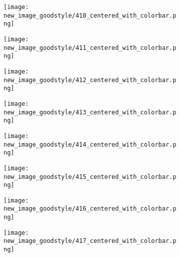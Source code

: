 \documentclass[a4paper,12pt]{article}
\begin{document}
\begin{figure}[H]
  \begin{subfigure}{0.11\textwidth}
    \texttt{[image: new\_image\_goodstyle/410\_centered\_with\_colorbar.png]}
  \end{subfigure}
  \hfill
  \begin{subfigure}{0.11\textwidth}
    \texttt{[image: new\_image\_goodstyle/411\_centered\_with\_colorbar.png]}
  \end{subfigure}
  \hfill
  \begin{subfigure}{0.11\textwidth}
    \texttt{[image: new\_image\_goodstyle/412\_centered\_with\_colorbar.png]}
  \end{subfigure}
  \hfill
  \begin{subfigure}{0.11\textwidth}
    \texttt{[image: new\_image\_goodstyle/413\_centered\_with\_colorbar.png]}
  \end{subfigure}
  \hfill
  \begin{subfigure}{0.11\textwidth}
    \texttt{[image: new\_image\_goodstyle/414\_centered\_with\_colorbar.png]}
  \end{subfigure}
  \hfill
  \begin{subfigure}{0.11\textwidth}
    \texttt{[image: new\_image\_goodstyle/415\_centered\_with\_colorbar.png]}
  \end{subfigure}
  \hfill
  \begin{subfigure}{0.11\textwidth}
    \texttt{[image: new\_image\_goodstyle/416\_centered\_with\_colorbar.png]}
  \end{subfigure}
  \hfill
  \begin{subfigure}{0.11\textwidth}
    \texttt{[image: new\_image\_goodstyle/417\_centered\_with\_colorbar.png]}
  \end{subfigure}
  \hfill
\end{figure}
\end{document}
